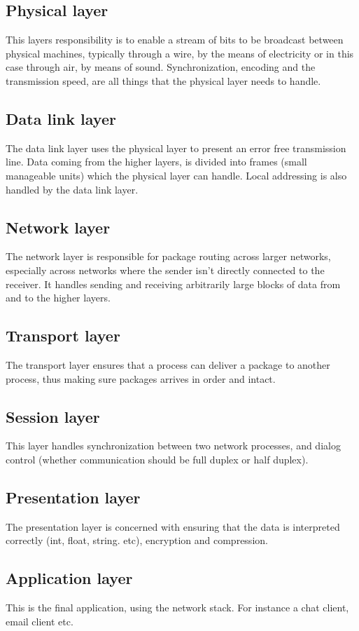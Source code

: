 \subsection{Physical layer}
This layers responsibility is to enable a stream of bits to be broadcast between physical machines, typically through a wire, by the means of electricity or in this case through air, by means of sound. Synchronization, encoding and the transmission speed, are all things that the physical layer needs to handle.

\subsection{Data link layer}
The data link layer uses the physical layer to present an error free transmission line. Data coming from the higher layers, is divided into frames (small manageable units) which the physical layer can handle. Local addressing is also handled by the data link layer.

\subsection{Network layer}
The network layer is responsible for package routing across larger networks, especially across networks where the sender isn't directly connected to the receiver. It handles sending and receiving arbitrarily large blocks of data from and to the higher layers.

\subsection{Transport layer}
The transport layer ensures that a process can deliver a package to another process, thus making sure packages arrives in order and intact.

\subsection{Session layer}
This layer handles synchronization between two network processes, and dialog control (whether communication should be full duplex or half duplex).

\subsection{Presentation layer}
The presentation layer is concerned with ensuring that the data is interpreted correctly (int, float, string. etc), encryption and compression.

\subsection{Application layer}
This is the final application, using the network stack. For instance a chat client, email client etc.
